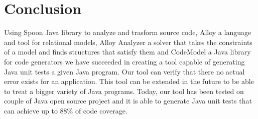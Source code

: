 \chapter*{Conclusion}
\label{ch:Conclusion}
	\thispagestyle{conclusion}
	 Using Spoon Java library to analyze and trasform source code, Alloy a language and tool for relational models, Alloy Analyzer a solver that takes the constraints of a model and finds structures that satisfy them and CodeModel a Java library for code generators we have succeeded in creating a tool capable of generating Java unit tests a given Java program. Our tool can verify that there no actual error exists for an application. This tool can be extended in the future to be able to treat a bigger variety of Java programs. Today, our tool has been tested on couple of Java open source project and it is able to generate Java unit tests that can achieve up to 88\% of code coverage.